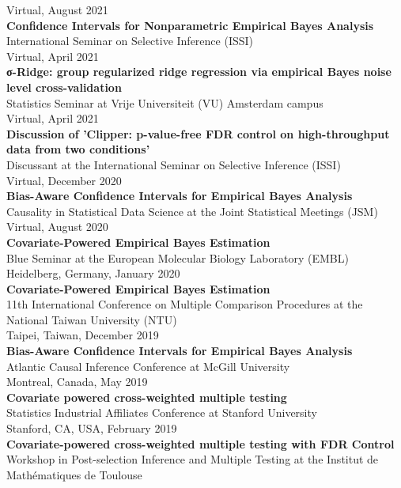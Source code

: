 \documentclass[margin,line]{res}
\begin{document}
\begin{resume}
\begin{adjustwidth*}{0pt}{0pt}
Virtual, August 2021
 \\
\textbf{Confidence Intervals for Nonparametric Empirical Bayes Analysis} \\
International Seminar on Selective Inference (ISSI) \\
Virtual, April 2021
 \\
\textbf{σ-Ridge: group regularized ridge regression via empirical Bayes noise level cross-validation} \\
Statistics Seminar at Vrije Universiteit (VU) Amsterdam campus \\
Virtual, April 2021
 \\
\textbf{Discussion of 'Clipper: p-value-free FDR control on high-throughput data from two conditions'} \\
Discussant at the International Seminar on Selective Inference (ISSI) \\
Virtual, December 2020
 \\
\textbf{Bias-Aware Confidence Intervals for Empirical Bayes Analysis} \\
Causality in Statistical Data Science at the Joint Statistical Meetings (JSM) \\
Virtual, August 2020
 \\
\textbf{Covariate-Powered Empirical Bayes Estimation} \\
Blue Seminar at the European Molecular Biology Laboratory (EMBL) \\
Heidelberg, Germany, January 2020
 \\
\textbf{Covariate-Powered Empirical Bayes Estimation} \\
11th International Conference on Multiple Comparison Procedures at the National Taiwan University (NTU) \\
Taipei, Taiwan, December 2019
 \\
\textbf{Bias-Aware Confidence Intervals for Empirical Bayes Analysis} \\
Atlantic Causal Inference Conference at McGill University \\
Montreal, Canada, May 2019
 \\
\textbf{Covariate powered cross-weighted multiple testing} \\
Statistics Industrial Affiliates Conference at Stanford University \\
Stanford, CA, USA, February 2019
 \\
\textbf{Covariate-powered cross-weighted multiple testing with FDR Control} \\
Workshop in Post-selection Inference and Multiple Testing at the Institut de Mathématiques de Toulouse \\

\end{adjustwidth*}
\end{resume}
\end{document}
